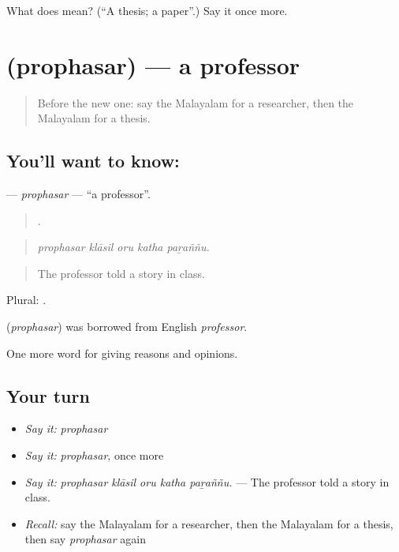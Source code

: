 \begin{tcolorbox}[breakable,colback=teal!4,colframe=teal!35!black,title={Before you move on}]
What does  mean? (\textquotedblleft{}A thesis; a paper\textquotedblright{}.) Say it once more.
\end{tcolorbox}
\section[\texorpdfstring{\ml{പ്രൊഫസർ} (prophasar)}{പ്രൊഫസർ (prophasar)}]{ (prophasar) — a professor}

\label{lesson:ML-C432-prophasar}



\begin{quote}
Before the new one: say the Malayalam for a researcher, then the Malayalam for a thesis.
\end{quote}

\subsection*{You'll want to know: }
\textbf{} — \emph{prophasar} — \textquotedblleft{}a professor\textquotedblright{}.

\begin{quote}
    .
\end{quote}

\begin{quote}
\emph{prophasar klāsil oru katha paṟaññu.}
\end{quote}

\begin{quote}
The professor told a story in class.
\end{quote}

Plural: .

\begin{cousinweb}
\textbf{} (\emph{prophasar}) was borrowed from English \emph{professor}.
\end{cousinweb}

\begin{grammarlens}[title={What you've built}]
One more word for giving reasons and opinions.
\end{grammarlens}

\subsection*{Your turn}
\begin{itemize}
\raggedright
  \item \emph{Say it:} \emph{prophasar}
  \item \emph{Say it:} \emph{prophasar}, once more
  \item \emph{Say it:} \emph{prophasar klāsil oru katha paṟaññu.} — The professor told a story in class.
  \item \emph{Recall:} say the Malayalam for a researcher, then the Malayalam for a thesis, then say \emph{prophasar} again
\end{itemize}

